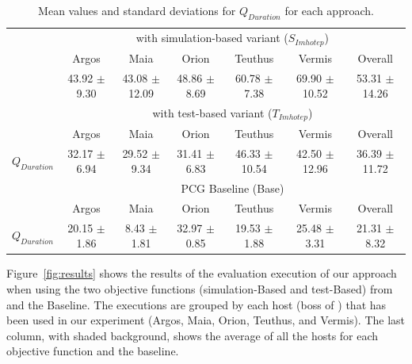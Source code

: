 \begin{table}[ht!]
\centering
\caption{Mean values and standard deviations for $Q_{Duration}$ for each approach.}
\label{tab:results}
\begin{tabular}{@{}ccccccc@{}}
\toprule
                                   & \multicolumn{6}{c}{\ApproachName{} with simulation-based variant ($S_{Imhotep}$)}                                           \\ \cmidrule(l){2-7} 
                                   & Argos            & Maia              & Orion            & Teuthus           & Vermis            & Overall           \\ \midrule
                                   \rowcolor[HTML]{C0C0C0}
\multicolumn{1}{r}{\cellcolor[HTML]{FFFFFF}{$Q_{Duration}$}} & 43.92 $\pm$ 9.30 & 43.08 $\pm$ 12.09 & 48.86 $\pm$ 8.69 & 60.78 $\pm$ 7.38  & 69.90 $\pm$ 10.52 & 53.31 $\pm$ 14.26 \\ \midrule
                                   & \multicolumn{6}{c}{\ApproachName{} with test-based variant ($T_{Imhotep}$)}                                                 \\ \cmidrule(l){2-7} 
                                   & Argos            & Maia              & Orion            & Teuthus           & Vermis            & Overall           \\ \midrule
\multicolumn{1}{r}{$Q_{Duration}$} & 32.17 $\pm$ 6.94 & 29.52 $\pm$ 9.34  & 31.41 $\pm$ 6.83 & 46.33 $\pm$ 10.54 & 42.50 $\pm$ 12.96 & 36.39 $\pm$ 11.72 \\ \midrule
                                   & \multicolumn{6}{c}{PCG Baseline (Base)}                                                                             \\ \cmidrule(l){2-7} 
                                   & Argos            & Maia              & Orion            & Teuthus           & Vermis            & Overall           \\ \midrule
\multicolumn{1}{r}{$Q_{Duration}$} & 20.15 $\pm$ 1.86 & 8.43 $\pm$ 1.81   & 32.97 $\pm$ 0.85 & 19.53 $\pm$ 1.88  & 25.48 $\pm$ 3.31  & 21.31 $\pm$ 8.32  \\ \bottomrule
\end{tabular}
\end{table}

Figure~\ref{fig:results} shows the results of the evaluation execution of our approach when using the two objective functions (simulation-Based and test-Based) from \ApproachName{} and the Baseline. The executions are grouped by each host (boss of \CaseStudy{}) that has been used in our experiment (Argos, Maia, Orion, Teuthus, and Vermis). The last column, with shaded background, shows the average of all the hosts for each objective function and the baseline. 

